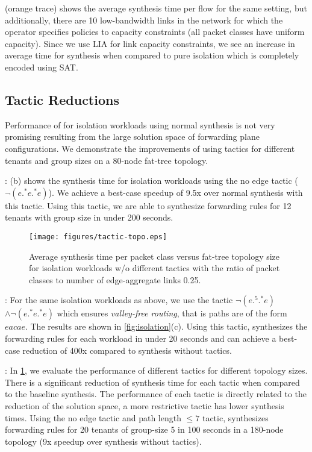   
 (orange trace) shows the average synthesis time per flow for the same setting, but
 additionally, there are 10 low-bandwidth links in the network for which the operator
 specifies policies to capacity constraints (all packet classes have uniform capacity). 
Since we use LIA for link capacity constraints, we see an 
increase in average time for synthesis 
when compared to pure isolation which is completely 
encoded using SAT. 
 \subsection{Tactic Reductions} \label{sec:tacticeval}
 Performance of \Name for isolation workloads using normal synthesis is not 
 very promising resulting from the large solution space of forwarding plane configurations. We 
 demonstrate the improvements of using tactics for different tenants and group sizes on a 
 80-node fat-tree topology.
 
 : (b) shows the synthesis time for isolation workloads using the no edge tactic 
 ($\neg(e .^* e .^* e)$). We achieve a best-case speedup of 9.5x over normal synthesis with this tactic. 
 Using this tactic, we are able to synthesize forwarding rules for 12 tenants with group size in under 200
 seconds.
 
 \begin{figure}[h]
 	\texttt{[image: figures/tactic-topo.eps]}
 	\caption{Average synthesis time per packet class versus fat-tree topology size for isolation workloads 
 		w/o different tactics with the ratio of packet classes to number of edge-aggregate links 0.25.}
 	\label{fig:tactic-topo}
 \end{figure}
 
:  
For the same isolation workloads as above, we use the tactic $\neg (e .^5 .^* e)$ $\wedge \neg (e .^* e .^* e)$
 which ensures {\em valley-free routing}, that is paths are of the form $eacae$. 
 The results are shown in \cref{fig:isolation}(c). 
 Using this tactic, \Name synthesizes the forwarding rules for each workload in under 20 seconds 
 and can achieve a best-case reduction of 400x compared to synthesis without tactics. 
 
: 
In \cref{fig:tactic-topo},
 we evaluate the performance of different tactics for different topology sizes. There is a
 significant reduction of synthesis time for each tactic when compared to the baseline synthesis.
 The performance of each tactic is directly related to the reduction of the solution space, a more
 restrictive tactic has lower synthesis times. 
  Using the no edge tactic
 and path length $\leq 7$ tactic, \Name synthesizes forwarding rules for 20 tenants of group-size 5 in 100 seconds in a 180-node
 topology (9x speedup over synthesis without tactics).
  

